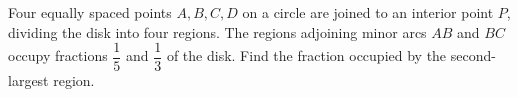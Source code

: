 Four equally spaced points $A,B,C,D$ on a circle are joined to an interior point $P$, dividing the disk into four regions. The regions adjoining minor arcs $AB$ and $BC$ occupy fractions $\dfrac{1}{5}$ and $\dfrac{1}{3}$ of the disk. Find the fraction occupied by the second-largest region.

